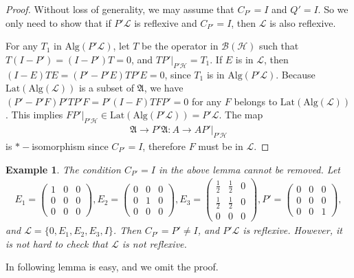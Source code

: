 \documentclass{amsart}
\newcommand{\AAA}{\mathfrak A}
\newcommand{\B}{\mathcal B}
\newcommand{\HHH}{\mathcal H} %
\newcommand{\LLL}{\mathcal L} %
\newcommand{\Lat}{\mathrm{Lat}}
\newcommand{\Alg}{\mathrm{Alg}}
\newtheorem{example}{Example}[section]
\begin{document}
\begin{proof}
Without loss of generality, we may assume that $C_{P'} = I$ and $Q' = I$. So we only need to show that if $P'\LLL$ is reflexive and $C_{P'} = I$, then $\LLL$ is also reflexive.

For any  $T_1$ in $\Alg(P'\LLL)$, let $T$ be the operator
in $\B(\HHH)$ such that $T(I-P')= (I-P')T = 0$, and $TP'|_{P'\HHH} = T_1$.
If $E$ is in $\LLL$, then $(I-E)TE = (P' - P'E)TP'E = 0$, since $T_1$ is in $\Alg(P'\LLL)$.
Because $\Lat(\Alg(\LLL))$ is a subset of $\AAA$, we have
$(P' - P'F)P'TP'F = P'(I-F)TFP' = 0$ for any $F$ belongs to $\Lat(\Alg(\LLL))$.
This implies $FP'|_{P'\HHH} \in \Lat(\Alg(P'\LLL)) = P'\LLL$. 
The map
\begin{align*}
\AAA \rightarrow P'\AAA: A \rightarrow AP'|_{P'\HHH}
\end{align*}
is $*-$isomorphism since $C_{P'} = I$, therefore $F$ must be in $\LLL$.
\end{proof}

\begin{example}
The condition $C_{P'} = I$ in the above lemma cannot be removed. Let 
\begin{align*}
E_1 = \left(\begin{array}{ccc}1 & 0 & 0 \\0 & 0 & 0 \\0 & 0 & 0\end{array}\right),
E_2 = \left(\begin{array}{ccc}0 & 0 & 0 \\0 & 1 & 0 \\0 & 0 & 0\end{array}\right),
E_3= \left(\begin{array}{ccc}\frac{1}{2} & \frac{1}{2} & 0 \\ \frac{1}{2} & \frac{1}{2} & 0 \\0 & 0 & 0\end{array}\right),
P' = \left(\begin{array}{ccc}0 & 0 & 0 \\0 & 0 & 0 \\0 & 0 & 1\end{array}\right),
\end{align*}
and $\LLL = \{ 0, E_1, E_2, E_3, I \}$. Then $C_{P' } = P' \neq I$, and $P' \LLL $ is reflexive.
However, it is not hard to check that $\LLL$ is not reflexive.
\end{example}

In following lemma is easy, and we omit the proof.
\end{document}
